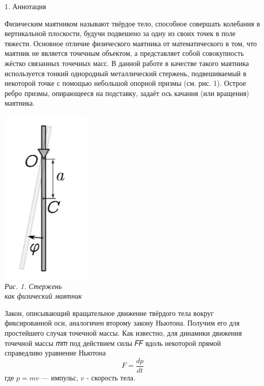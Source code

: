 \documentclass[12pt, a4paper]{article}
\begin{document}
        {\Large 1. Аннотация \\}
        \noindent\begin{minipage}[c]{0.67\textwidth}
            \hspace{1cm}
            Физическим маятником называют твёрдое тело, способное совершать колебания в вертикальной плоскости,
            будучи подвешено за одну из своих точек в поле тяжести.
            Основное отличие физического маятника от математического в том, что маятник не является точечным объектом,
            а представляет собой совокупность жёстко связанных точечных масс. В данной работе в качестве такого маятника
            используется тонкий однородный металлический стержень, подвешиваемый в некоторой точке с помощью небольшой опорной призмы (см. рис. 1). Острое ребро
            призмы, опирающееся на подставку, задаёт ось качания
            (или вращения) маятника.
        \end{minipage}
        \begin{minipage}[c]{0.32\textwidth}
            \begin{center}
                \includegraphics[scale=0.6]{Pics/picture1.jpg} \\
                \textit{\textcolor[HTML]{000000}{Рис. 1. Стержень \\ как физический маятник}}
            \end{center}
        \end{minipage}  
        Закон, описывающий вращательное движение твёрдого тела вокруг
        фиксированной оси, аналогичен второму закону Ньютона. Получим его для
        простейшего случая точечной массы.
        Как известно, для динамики движения точечной массы 𝑚𝑚 под действием
        силы 𝐹𝐹 вдоль некоторой прямой справедливо уравнение Ньютона
        \begin{displaymath}
            F = \frac{dp}{dt}
        \end{displaymath}
        где $p = mv$ --- импульс, $v$ - скорость тела. \\
        
\end{document}
